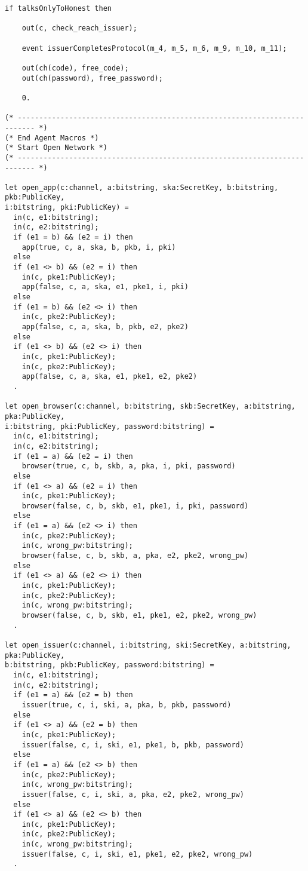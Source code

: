 \begin{Verbatim}[fontsize=\small]
    if talksOnlyToHonest then

    out(c, check_reach_issuer);

    event issuerCompletesProtocol(m_4, m_5, m_6, m_9, m_10, m_11);

    out(ch(code), free_code);
    out(ch(password), free_password);

    0.

(* -------------------------------------------------------------------------- *)
(* End Agent Macros *)
(* Start Open Network *)
(* -------------------------------------------------------------------------- *)

let open_app(c:channel, a:bitstring, ska:SecretKey, b:bitstring, pkb:PublicKey, 
i:bitstring, pki:PublicKey) =
  in(c, e1:bitstring);
  in(c, e2:bitstring);
  if (e1 = b) && (e2 = i) then
    app(true, c, a, ska, b, pkb, i, pki)
  else
  if (e1 <> b) && (e2 = i) then
    in(c, pke1:PublicKey);
    app(false, c, a, ska, e1, pke1, i, pki)
  else
  if (e1 = b) && (e2 <> i) then
    in(c, pke2:PublicKey);
    app(false, c, a, ska, b, pkb, e2, pke2)
  else
  if (e1 <> b) && (e2 <> i) then
    in(c, pke1:PublicKey);
    in(c, pke2:PublicKey);
    app(false, c, a, ska, e1, pke1, e2, pke2)
  .

let open_browser(c:channel, b:bitstring, skb:SecretKey, a:bitstring, pka:PublicKey, 
i:bitstring, pki:PublicKey, password:bitstring) =
  in(c, e1:bitstring);
  in(c, e2:bitstring);
  if (e1 = a) && (e2 = i) then
    browser(true, c, b, skb, a, pka, i, pki, password)
  else
  if (e1 <> a) && (e2 = i) then
    in(c, pke1:PublicKey);
    browser(false, c, b, skb, e1, pke1, i, pki, password)
  else
  if (e1 = a) && (e2 <> i) then
    in(c, pke2:PublicKey);
    in(c, wrong_pw:bitstring);
    browser(false, c, b, skb, a, pka, e2, pke2, wrong_pw)
  else
  if (e1 <> a) && (e2 <> i) then
    in(c, pke1:PublicKey);
    in(c, pke2:PublicKey);
    in(c, wrong_pw:bitstring);
    browser(false, c, b, skb, e1, pke1, e2, pke2, wrong_pw)
  .

let open_issuer(c:channel, i:bitstring, ski:SecretKey, a:bitstring, pka:PublicKey, 
b:bitstring, pkb:PublicKey, password:bitstring) =
  in(c, e1:bitstring);
  in(c, e2:bitstring);
  if (e1 = a) && (e2 = b) then
    issuer(true, c, i, ski, a, pka, b, pkb, password)
  else
  if (e1 <> a) && (e2 = b) then
    in(c, pke1:PublicKey);
    issuer(false, c, i, ski, e1, pke1, b, pkb, password)
  else
  if (e1 = a) && (e2 <> b) then
    in(c, pke2:PublicKey);
    in(c, wrong_pw:bitstring);
    issuer(false, c, i, ski, a, pka, e2, pke2, wrong_pw)
  else
  if (e1 <> a) && (e2 <> b) then
    in(c, pke1:PublicKey);
    in(c, pke2:PublicKey);
    in(c, wrong_pw:bitstring);
    issuer(false, c, i, ski, e1, pke1, e2, pke2, wrong_pw)
  .



\end{Verbatim}
